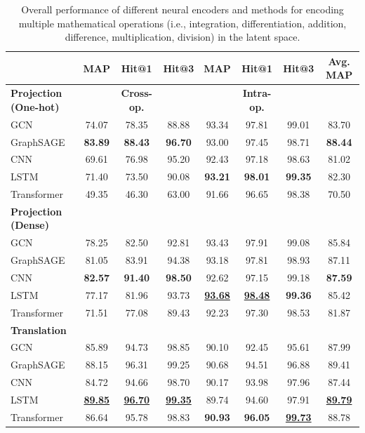 \documentclass[11pt]{article}
\begin{document}
\begin{table}[t]
    \tiny
    \centering
    \begin{tabular}{l|ccc|ccc|c}
        \toprule
         \textbf{}  & \textbf{MAP} & \textbf{Hit@1} & \textbf{Hit@3} & \textbf{MAP} & \textbf{Hit@1} & \textbf{Hit@3} & \textbf{Avg. MAP}\\ 
       \midrule
       \textbf{Projection (One-hot)} & & \textbf{Cross-op.} & & & \textbf{Intra-op.} &\\
       \midrule
       GCN & 74.07 & 78.35 & 88.88 & 93.34 & 97.81 & 99.01 & 83.70 \\
       GraphSAGE & \textbf{83.89} & \textbf{88.43} & \textbf{96.70} & 93.00 & 97.45 & 98.71 & \textbf{88.44} \\
       \midrule
       CNN& 69.61 & 76.98 & 95.20 & 92.43 & 97.18 & 98.63 &  81.02\\
       LSTM & 71.40 & 73.50 & 90.08 & \textbf{93.21} & \textbf{98.01} & \textbf{99.35} & 82.30\\
       Transformer& 49.35 & 46.30 & 63.00 & 91.66 & 96.65 & 98.38 & 70.50\\
       \midrule
       \textbf{Projection (Dense)} & & & & & & \\
        \midrule
       GCN & 78.25 & 82.50 & 92.81 & 93.43 & 97.91 & 99.08 & 85.84\\
       GraphSAGE & 81.05 & 83.91 & 94.38 & 93.18 & 97.81 & 98.93 & 87.11\\
       \midrule
       CNN& \textbf{82.57} & \textbf{91.40} & \textbf{98.50} & 92.62 & 97.15 & 99.18 & \textbf{87.59}\\
       LSTM & 77.17 & 81.96 & 93.73 & \underline{\textbf{93.68}} & \underline{\textbf{98.48}} & \textbf{99.36} & 85.42\\
       Transformer & 71.51 & 77.08 & 89.43 & 92.23 & 97.30 & 98.53 & 81.87\\
       \midrule
       \textbf{Translation} & & & & & & \\
       \midrule
       GCN & 85.89 & 94.73 & 98.85 & 90.10 & 92.45 & 95.61 & 87.99\\
       GraphSAGE & 88.15 & 96.31 & 99.25 & 90.68 & 94.51 & 96.88 & 89.41\\
       \midrule
       CNN & 84.72 & 94.66 & 98.70 & 90.17 & 93.98 & 97.96 & 87.44 \\
       LSTM& \underline{\textbf{89.85}} & \underline{\textbf{96.70}} & \underline{\textbf{99.35}} & 89.74 & 94.60 & 97.91 & \underline{\textbf{89.79}}\\
       Transformer& 86.64  & 95.78 &  98.83 &  \textbf{90.93}  &  \textbf{96.05} & \underline{\textbf{99.73}} & 88.78 \\
       \bottomrule
        \end{tabular}
    \caption{Overall performance of different neural encoders and methods for encoding multiple mathematical operations (i.e., integration, differentiation, addition, difference, multiplication, division) in the latent space.}
    \label{tab:compare_approaches_overall}
\end{table}
\end{document}

